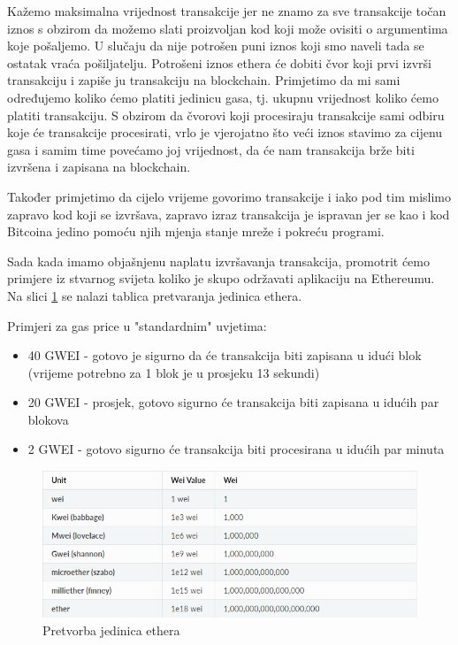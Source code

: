 \documentclass[12pt]{report}
\begin{document}
Kažemo maksimalna vrijednost transakcije jer ne znamo za sve transakcije točan iznos s obzirom da možemo slati proizvoljan kod koji može ovisiti o argumentima koje pošaljemo. U slučaju da nije potrošen puni iznos koji smo naveli tada se ostatak vraća pošiljatelju. Potrošeni iznos ethera će dobiti čvor koji prvi izvrši transakciju i zapiše ju transakciju na blockchain. Primjetimo da mi sami određujemo koliko ćemo platiti jedinicu gasa, tj. ukupnu vrijednost koliko ćemo platiti transakciju. S obzirom da čvorovi koji procesiraju transakcije sami odbiru koje će transakcije procesirati, vrlo je vjerojatno što veći iznos stavimo za cijenu gasa i samim time povećamo joj vrijednost, da će nam transakcija brže biti izvršena i zapisana na blockchain.

Također primjetimo da cijelo vrijeme govorimo transakcije i iako pod tim mislimo zapravo kod koji se izvršava, zapravo izraz transakcija je ispravan jer se kao i kod Bitcoina jedino pomoću njih mjenja stanje mreže i pokreću programi.

Sada kada imamo objašnjenu naplatu izvršavanja transakcija, promotrit ćemo primjere iz stvarnog svijeta koliko je skupo održavati aplikaciju na Ethereumu. Na slici \ref{fig:ethunits} se nalazi tablica pretvaranja jedinica ethera.

Primjeri za gas price u "standardnim" uvjetima: 
\begin{itemize}
    \item 40 GWEI - gotovo je sigurno da će transakcija biti zapisana u idući blok (vrijeme potrebno za 1 blok je u prosjeku 13 sekundi)
    \item 20 GWEI - prosjek, gotovo sigurno će transakcija biti zapisana u idućih par blokova
    \item 2 GWEI - gotovo sigurno će transakcija biti procesirana u idućih par minuta
\end{itemize}

\begin{figure}[!]
\centering
\includegraphics[scale=0.55]{ether_units}
\caption{Pretvorba jedinica ethera}
\label{fig:ethunits}
\end{figure}
\end{document}
